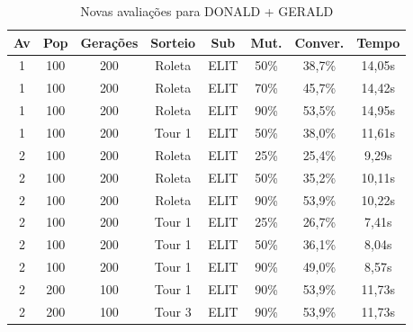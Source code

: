 \documentclass[a4paper, 12pt]{article}
\begin{document}
  \begin{table}[h]
    \centering
    \begin{tabular}{|c|c|c|c|c|c|c|c|}
      \hline
      Av & Pop & Gerações & Sorteio & Sub & Mut. & Conver. & Tempo  \\
      \hline
      1 & 100 & 200 & Roleta & ELIT & 50\% &38,7\% & 14,05s\\
      \hline
      1 & 100 & 200 & Roleta & ELIT & 70\% &45,7\% & 14,42s\\
      \hline
      1 & 100 & 200 & Roleta & ELIT & 90\% &53,5\% & 14,95s\\
      \hline
      1 & 100 & 200 & Tour 1 & ELIT & 50\% &38,0\% & 11,61s\\
      \hline
      2 & 100 & 200 & Roleta & ELIT & 25\% &25,4\% & 9,29s\\
      \hline
      2 & 100 & 200 & Roleta & ELIT & 50\% &35,2\% & 10,11s\\
      \hline
      2 & 100 & 200 & Roleta & ELIT & 90\% &53,9\% & 10,22s\\
      \hline
      2 & 100 & 200 & Tour 1 & ELIT & 25\% &26,7\% & 7,41s\\
      \hline
      2 & 100 & 200 & Tour 1 & ELIT & 50\% &36,1\% & 8,04s\\
      \hline
      2 & 100 & 200 & Tour 1 & ELIT & 90\% &49,0\% & 8,57s\\
      \hline
      2 & 200 & 100 & Tour 1 & ELIT & 90\% &53,9\% & 11,73s\\
      \hline
      2 & 200 & 100 & Tour 3 & ELIT & 90\% &53,9\% & 11,73s\\
      \hline
    \end{tabular}
    \caption{Novas avaliações para DONALD + GERALD}
    \label{tab:donald}
  \end{table}
\end{document}
